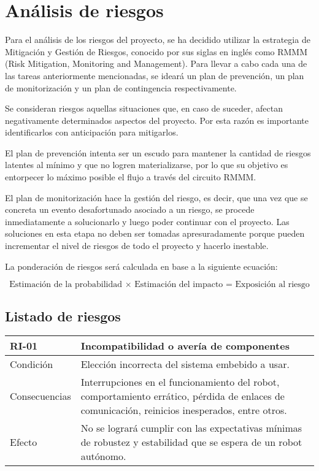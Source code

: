 \chapter{Análisis de riesgos}

Para el análisis de los riesgos del proyecto, se ha decidido utilizar la estrategia de Mitigación y Gestión de Riesgos, conocido por sus siglas en inglés como RMMM (Risk Mitigation, Monitoring and Management). Para llevar a cabo cada una de las tareas anteriormente mencionadas, se ideará un plan de prevención, un plan de monitorización y un plan de contingencia respectivamente.

Se consideran riesgos aquellas situaciones que, en caso de suceder, afectan negativamente determinados aspectos del proyecto. Por esta razón es importante identificarlos con anticipación para mitigarlos.

El plan de prevención intenta ser un escudo para mantener la cantidad de riesgos latentes al mínimo y que no logren materializarse, por lo que su objetivo es entorpecer lo máximo posible el flujo a través del circuito RMMM.

El plan de monitorización hace la gestión del riesgo, es decir, que una vez que se concreta un evento desafortunado asociado a un riesgo, se procede inmediatamente a solucionarlo y luego poder continuar con el proyecto. Las soluciones en esta etapa no deben ser tomadas apresuradamente porque pueden incrementar el nivel de riesgos de todo el proyecto y hacerlo inestable.

La ponderación de riesgos será calculada en base a la siguiente ecuación:

$$ \text{Estimación de la probabilidad $\times$ Estimación del impacto = Exposición al riesgo} $$

\section{Listado de riesgos}

\begin{center}
\begin{tabular} {|m{2.5cm}|m{11.5cm}|}
	\hline
	RI-01 & Incompatibilidad o avería de componentes \\
	\hline
    	Condición & Elección incorrecta del sistema embebido a usar. \\
	\hline
    	Consecuencias & Interrupciones en el funcionamiento del robot, comportamiento errático, pérdida de enlaces de comunicación, reinicios inesperados, entre otros. \\
	\hline
    	Efecto & No se logrará cumplir con las expectativas mínimas de robustez y estabilidad que se espera de un robot autónomo. \\
	\hline
\end{tabular}
\end{center}

